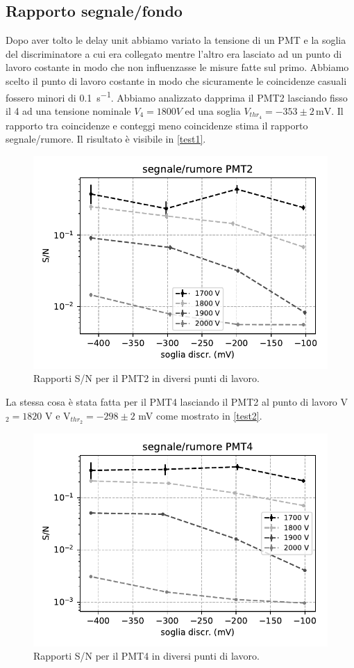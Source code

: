 \documentclass[a4paper]{article}
\begin{document}


\subsection*{Rapporto segnale/fondo}

%

Dopo aver tolto le delay unit abbiamo variato la tensione di un PMT  e la soglia del discriminatore a cui era collegato mentre l'altro era lasciato ad un punto di lavoro costante in modo che non influenzasse le misure fatte sul primo.
Abbiamo scelto il punto di lavoro costante in modo che sicuramente le coincidenze casuali fossero minori di \SI{0.1}{s^{-1}}.
Abbiamo analizzato dapprima il PMT2 lasciando fisso il 4 ad una tensione nominale $V_4=\SI{1800} V$ ed una soglia $V_{thr_4}=-353\pm2\,\mathrm{mV}$. 
Il rapporto tra coincidenze e conteggi meno coincidenze stima il rapporto segnale/rumore.
Il risultato è visibile in \autoref{test1}.

\begin{figure}[h]
\centering
\includegraphics[width=8 cm]{calib_pmt2}
\caption{Rapporti S/N per il PMT2 in diversi punti di lavoro.}
\label{test1}
\end{figure}

La stessa cosa è stata fatta per il PMT4 lasciando il PMT2 al punto di lavoro V$_2=1820$\! V e V$_{thr_2}=-298\pm2$\! mV come mostrato in \autoref{test2}.

\begin{figure}[h]
\centering
\includegraphics[width=8 cm]{calib_pmt4}
\caption{Rapporti S/N per il PMT4 in diversi punti di lavoro.}
\label{test2}
\end{figure}
\end{document}
